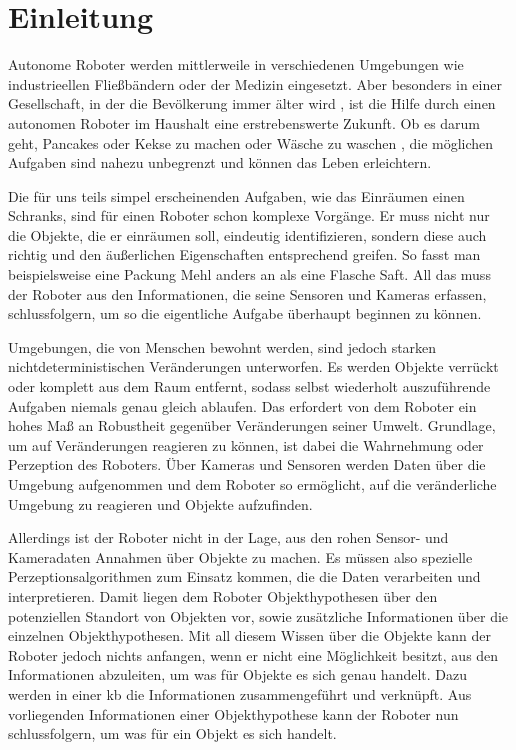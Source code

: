 \graphicspath{{./images/}}      
\def\CHAPTERONE{./chapters/Chapter-1} 

\chapter{Einleitung}
\label{chap:introduction}
%	
Autonome Roboter werden mittlerweile in verschiedenen Umgebungen wie industrieellen Fließbändern oder der Medizin eingesetzt. Aber besonders in einer Gesellschaft, in der die Bevölkerung immer älter wird \cite{peopleGetOlder}, ist die Hilfe durch einen autonomen Roboter im Haushalt eine erstrebenswerte Zukunft. Ob es darum geht, Pancakes \cite{beetzPancake} oder Kekse \cite{bakeBot} zu machen oder Wäsche zu waschen \cite{laundry}, die möglichen Aufgaben sind nahezu unbegrenzt und können das Leben erleichtern. \par

Die für uns teils simpel erscheinenden Aufgaben, wie das Einräumen einen Schranks, sind für einen Roboter schon komplexe Vorgänge. Er muss nicht nur die Objekte, die er einräumen soll, eindeutig identifizieren, sondern diese auch richtig und den äußerlichen Eigenschaften entsprechend greifen. So fasst man beispielsweise eine Packung Mehl anders an als eine Flasche Saft. All das muss der Roboter aus den Informationen, die seine Sensoren und Kameras erfassen, schlussfolgern, um so die eigentliche Aufgabe überhaupt beginnen zu können. \par

Umgebungen, die von Menschen bewohnt werden, sind jedoch starken nichtdeterministischen Veränderungen unterworfen. Es werden Objekte verrückt oder komplett aus dem Raum entfernt, sodass selbst wiederholt auszuführende Aufgaben niemals genau gleich ablaufen. Das erfordert von dem Roboter ein hohes Maß an Robustheit gegenüber Veränderungen seiner Umwelt. Grundlage, um auf Veränderungen reagieren zu können, ist dabei die Wahrnehmung oder Perzeption des Roboters. Über Kameras und Sensoren werden Daten über die Umgebung aufgenommen und dem Roboter so ermöglicht, auf die veränderliche Umgebung zu reagieren und Objekte aufzufinden. \par

Allerdings ist der Roboter nicht in der Lage, aus den rohen Sensor- und Kameradaten Annahmen über Objekte zu machen. Es müssen also spezielle Perzeptionsalgorithmen zum Einsatz kommen, die die Daten verarbeiten und interpretieren. Damit liegen dem Roboter Objekthypothesen über den potenziellen Standort von Objekten vor, sowie zusätzliche Informationen über die einzelnen Objekthypothesen. Mit all diesem Wissen über die Objekte kann der Roboter jedoch nichts anfangen, wenn er nicht eine Möglichkeit besitzt, aus den Informationen abzuleiten, um was für Objekte es sich genau handelt. Dazu werden in einer \gls{kb} die Informationen zusammengeführt und verknüpft. Aus vorliegenden Informationen einer Objekthypothese kann der Roboter nun schlussfolgern, um was für ein Objekt es sich handelt.    \par    

